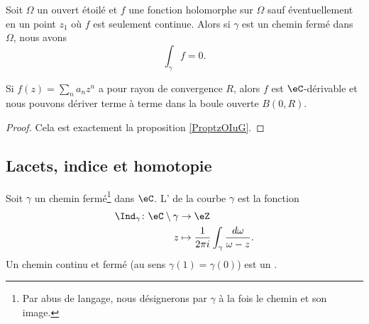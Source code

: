 \begin{proposition}   \label{PrpopwQSbJg}
    Soit \( \Omega\) un ouvert étoilé et \( f\) une fonction holomorphe sur \( \Omega\) sauf éventuellement en un point \( z_1\) où \( f\) est seulement continue. Alors si \( \gamma\) est un chemin fermé dans \( \Omega\), nous avons
    \begin{equation}
        \int_{\gamma}f=0.
    \end{equation}
\end{proposition}


\begin{proposition}     \label{PropRZCKeO}
    Si \( f(z)=\sum_na_nz^n\) a pour rayon de convergence \( R\), alors \( f\) est $\eC$-dérivable et nous pouvons dériver terme à terme dans la boule ouverte \( B(0,R)\).
\end{proposition}

\begin{proof}
    Cela est exactement la proposition \ref{ProptzOIuG}.
\end{proof}

\subsection{Lacets, indice et homotopie}

\begin{definition}
    Soit \( \gamma\) un chemin fermé\footnote{Par abus de langage, nous désignerons par \( \gamma\) à la fois le chemin et son image.} dans \( \eC\). L' de la courbe \( \gamma\) est la fonction
    \begin{equation}
        \begin{aligned}
            \Ind_{\gamma}\colon \eC\setminus \gamma&\to \eZ \\
            z&\mapsto \frac{1}{ 2\pi i }\int_{\gamma}\frac{ d\omega }{ \omega-z }. 
        \end{aligned}
    \end{equation}
    Un chemin continu et fermé (au sens \( \gamma(1)=\gamma(0)\)) est un .
\end{definition}

